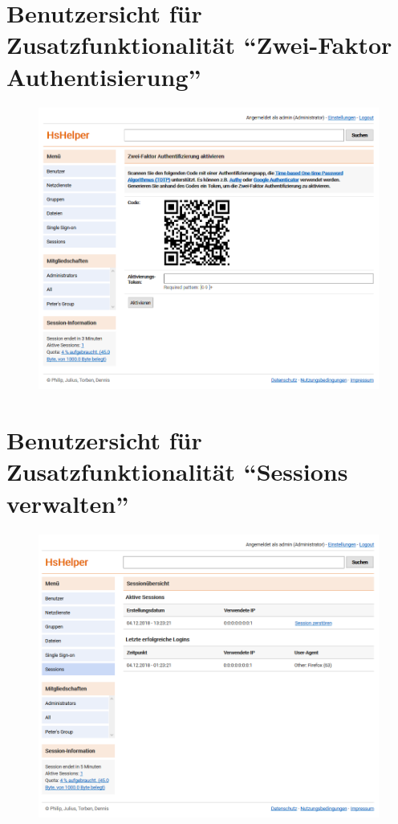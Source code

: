 \documentclass[12pt,DIV14,BCOR10mm,a4paper,parskip=half-,headsepline,headinclude,english,ngerman,bibliography=totocnumbered]{scrreprt}
\begin{document}
\begin{appendices}
\chapter{Benutzersicht für Zusatzfunktionalität \enquote{Zwei-Faktor Authentisierung}}
\begin{figure}[!htb]
	\hspace*{-1cm}
	\includegraphics[width=0.8\paperwidth]{resources/two-auth-factor-manual.png}
	\label{manual:two-auth-factor}
\end{figure}

\chapter{Benutzersicht für Zusatzfunktionalität \enquote{Sessions verwalten}}
\begin{figure}[!htb]
	\hspace*{-1cm}
	\includegraphics[width=0.8\paperwidth]{resources/sessions-manual.png}
  \label{manual:sessions}
\end{figure}


\end{appendices}
\end{document}
